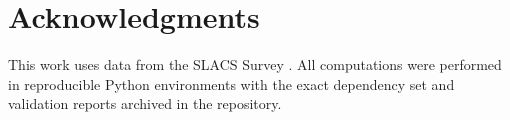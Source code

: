 \documentclass[journal]{IEEEtran}
\begin{document}
\section*{Acknowledgments}
This work uses data from the SLACS Survey \citep{Bolton2008}.
All computations were performed in reproducible Python environments with the
exact dependency set and validation reports archived in the repository.



\end{document}
